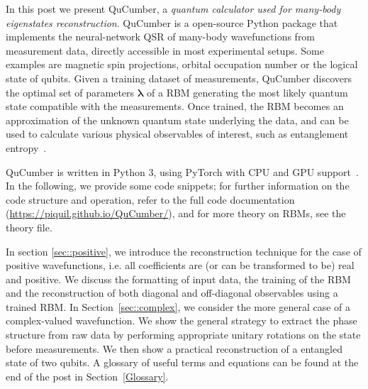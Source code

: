 \documentclass[submission, Phys]{SciPost}
\begin{document}
In this post we present QuCumber, a {\it quantum calculator used for many-body eigenstates reconstruction}. QuCumber is a open-source Python package that implements the neural-network QSR of many-body wavefunctions from measurement data, directly accessible in most experimental setups. Some examples are magnetic spin projections, orbital occupation number or the logical state of qubits. Given a training dataset of measurements, QuCumber discovers the optimal set of parameters $\bm{\lambda}$ of a RBM generating the most likely quantum state compatible with the measurements. Once trained, the RBM becomes an approximation of the unknown quantum state underlying the data, and can be used to calculate various physical observables of interest, such as entanglement entropy~\cite{torlai2018tomography}.



QuCumber is written in Python 3, using PyTorch with CPU and GPU support~\cite{paszke2017automatic}.
In the following, we provide some code snippets; for further information on the code structure and operation, 
refer to the full code documentation (\url{https://piquil.github.io/QuCumber/}),
and for more theory on RBMs, see the theory file.




In section \ref{sec::positive}, we introduce the reconstruction technique for the case of positive wavefunctions, i.e. all coefficients are (or can be transformed to be) real and positive. We discuss the formatting of input data, the training of the RBM and the reconstruction of both diagonal and off-diagonal observables using a trained RBM. In Section~\ref{sec::complex}, we consider the more general case of a complex-valued wavefunction. We show the general strategy to extract the phase structure from raw data by performing appropriate unitary rotations on the state before measurements. We then show a practical reconstruction of a entangled state of two qubits. A glossary of useful terms and equations can be found at the end of the post in Section~\ref{Glossary}.



\end{document}
